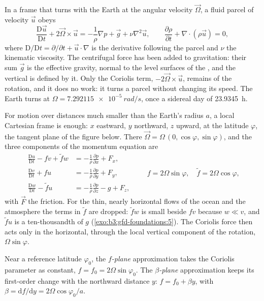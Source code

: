 In a frame that turns with the Earth at the angular velocity
$\vec\Omega$, a fluid parcel of velocity $\vec u$ obeys
\[
\frac{\mathrm D\vec u}{\mathrm Dt} + 2\vec\Omega\times\vec u =
-\frac{1}{\rho}\nabla p + \vec g + \nu\nabla^2\vec u ,
\qquad
\frac{\partial\rho}{\partial t} + \nabla\cdot(\rho\vec u) = 0 ,
\]
where $\mathrm D/\mathrm Dt = \partial/\partial t + \vec u\cdot\nabla$ is
the derivative following the parcel and $\nu$ the kinematic viscosity. The
centrifugal force has been added to gravitation: their sum $\vec g$ is the
effective gravity, normal to the level surfaces of the , and
the vertical is defined by it. Only the Coriolis term, $-2\vec\Omega\times
\vec u$, remains of the rotation, and it does no work: it turns a parcel
without changing its speed. The Earth turns at $\Omega =
\qty{7.292115e-5}{rad/s}$, once a sidereal day of \qty{23.9345}{h}.

For motion over distances much smaller than the Earth's radius $a$, a
local Cartesian frame is enough: $x$ eastward, $y$ northward, $z$ upward,
at the latitude $\varphi$, the tangent plane of the figure below. There
$\vec\Omega = \Omega\,(0, \cos\varphi, \sin\varphi)$, and the three
components of the momentum equation are
\[
\begin{aligned}
\frac{\mathrm Du}{\mathrm Dt} - f v + \tilde f w &= -\frac{1}{\rho}\frac{\partial p}{\partial x} + F_x ,\\
\frac{\mathrm Dv}{\mathrm Dt} + f u &= -\frac{1}{\rho}\frac{\partial p}{\partial y} + F_y ,\\
\frac{\mathrm Dw}{\mathrm Dt} - \tilde f u &= -\frac{1}{\rho}\frac{\partial p}{\partial z} - g + F_z ,
\end{aligned}
\qquad f = 2\Omega\sin\varphi,\quad \tilde f = 2\Omega\cos\varphi ,
\]
with $\vec F$ the friction. For the thin, nearly horizontal flows of the
ocean and the atmosphere the terms in $\tilde f$ are dropped: $\tilde f w$
is small beside $fv$ because $w \ll v$, and $\tilde f u$ is a ten-thousandth
of $g$ (\cref{exo:b3:gfd-foundations:5}). The Coriolis force then acts only
in the horizontal, through the local vertical component of the rotation,
$\Omega\sin\varphi$.

\begin{definition}\label{def:b3:gfd-foundations:planes}
Near a reference latitude $\varphi_0$, the \emph{$f$-plane}
approximation takes the Coriolis parameter as constant, $f = f_0 =
2\Omega\sin\varphi_0$. The \emph{$\beta$-plane}
approximation keeps its first-order change with the northward distance $y$:
$f = f_0 + \beta y$, with $\beta = \mathrm df/\mathrm dy = 2\Omega
\cos\varphi_0/a$.
\end{definition}

